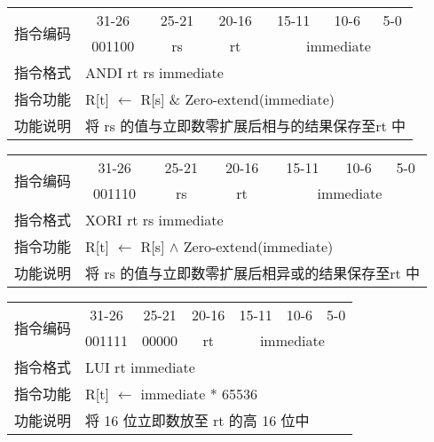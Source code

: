 \documentclass[a4paper,UTF8,fntef]{ctexart}
\begin{document}
	\begin{table}[!hbp]
		\centering
		\begin{tabular}{|c|c|c|c|c|c|c|}
		\hline
		\multirow{2}{*}{指令编码} & 31-26&25-21 & 20-16&15-11 &10-6 &5-0\\
		\cline{2-7} & 001100 & rs & rt & \multicolumn{3}{|c|}{immediate} \\
		\hline
		指令格式&\multicolumn{6}{|l|}{ANDI rt rs immediate}\\
		\hline		
		指令功能&\multicolumn{6}{|l|}{R[t] $\leftarrow$  R[s] \& Zero-extend(immediate)}\\
		\hline		
		功能说明&\multicolumn{6}{|l|}{将 rs 的值与立即数零扩展后相与的结果保存至rt 中}\\
		\hline
		\end{tabular}
	\end{table}
	\begin{table}[!hbp]
		\centering
		\begin{tabular}{|c|c|c|c|c|c|c|}
		\hline
		\multirow{2}{*}{指令编码} & 31-26&25-21 & 20-16&15-11 &10-6 &5-0\\
		\cline{2-7} & 001110 & rs & rt & \multicolumn{3}{|c|}{immediate} \\
		\hline
		指令格式&\multicolumn{6}{|l|}{XORI rt rs immediate}\\
		\hline		
		指令功能&\multicolumn{6}{|l|}{R[t] $\leftarrow$  R[s] $\land$ Zero-extend(immediate)}\\
		\hline		
		功能说明&\multicolumn{6}{|l|}{将 rs 的值与立即数零扩展后相异或的结果保存至rt 中}\\
		\hline
		\end{tabular}
	\end{table}
	\begin{table}[!hbp]
		\centering
		\begin{tabular}{|c|c|c|c|c|c|c|}
		\hline
		\multirow{2}{*}{指令编码} & 31-26&25-21 & 20-16&15-11 &10-6 &5-0\\
		\cline{2-7} & 001111 & 00000 & rt & \multicolumn{3}{|c|}{immediate} \\
		\hline
		指令格式&\multicolumn{6}{|l|}{LUI rt immediate}\\
		\hline		
		指令功能&\multicolumn{6}{|l|}{R[t] $\leftarrow$   immediate * 65536}\\
		\hline		
		功能说明&\multicolumn{6}{|l|}{将 16 位立即数放至 rt 的高 16 位中}\\
		\hline
		\end{tabular}
	\end{table}
\end{document}
